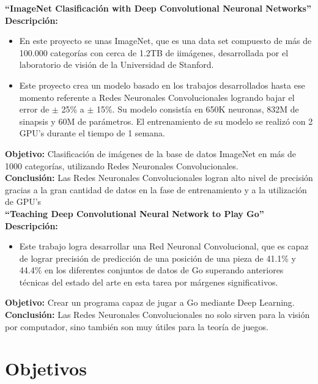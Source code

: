 \textbf{“ImageNet Clasificación with Deep Convolutional Neuronal Networks” \cite{8krizhevsky2012imagenet}}\\
\textbf{Descripción:}\\

\begin{itemize}
\item En este proyecto se unas ImageNet, que es una data set compuesto de más de 100.000 categorías con cerca de 1.2TB de iimágenes, desarrollada por el laboratorio de visión de la Universidad de Stanford.
\item Este proyecto crea un modelo basado en los trabajos desarrollados hasta ese momento referente a Redes Neuronales Convolucionales logrando bajar el error de $\pm$ 25\% a $\pm$ 15\%. Su modelo consistía en 650K neuronas, 832M de sinapsis y 60M de parámetros. El entrenamiento de su modelo se realizó con 2 GPU’s durante el tiempo de 1 semana.
\end{itemize}
\textbf{Objetivo:} Clasificación de imágenes de la base de datos ImageNet en más de 1000 categorías, utilizando Redes Neuronales Convolucionales.\\
\textbf{Conclusión:} Las Redes Neuronales Convolucionales logran alto nivel de precisión gracias a la gran cantidad de datos en la fase de entrenamiento y a la utilización de GPU's\\




\textbf{“Teaching Deep Convolutional Neural Network to Play Go” \cite{13clark2015training}}\\
\textbf{Descripción:}\\

\begin{itemize}
\item Este trabajo logra desarrollar una Red Neuronal Convolucional, que es capaz de lograr precisión de predicción de una posición de una pieza de 41.1\% y 44.4\% en los diferentes conjuntos de datos de Go superando anteriores técnicas del estado del arte en esta tarea por márgenes significativos.
\end{itemize}
\textbf{Objetivo:} Crear un programa capaz de jugar a Go mediante Deep Learning.\\
\textbf{Conclusión:} Las Redes Neuronales Convolucionales no solo sirven para la visión por computador, sino también son muy útiles para la teoría de juegos.\\


\section{Objetivos}
